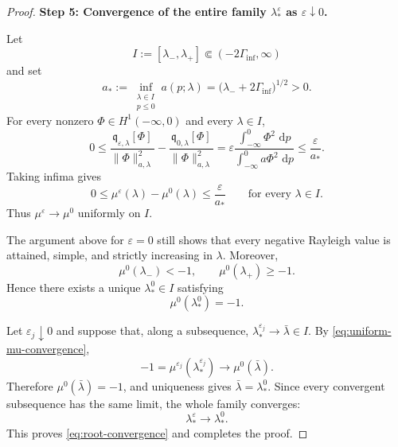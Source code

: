 \documentclass[10pt,a4paper]{amsart}
\newcommand{\dd}{\,\mathrm{d}}
\begin{document}
\begin{proof}
\medskip
\noindent
\textbf{Step 5: Convergence of the entire family
$\lambda_*^\varepsilon$ as $\varepsilon\downarrow0$.}

Let
\[
I:=[\lambda_-,\lambda_+]
\Subset(-2\Gamma_{\inf},\infty)
\]
and set
\[
a_*:=\inf_{\substack{\lambda\in I\\p\leq0}}
a(p;\lambda)
=
\bigl(\lambda_-+2\Gamma_{\inf}\bigr)^{1/2}>0.
\]
For every nonzero $\Phi\in H^1(-\infty,0)$ and every $\lambda\in I$,
\[
0
\leq
\frac{\mathfrak q_{\varepsilon,\lambda}[\Phi]}
{\|\Phi\|_{a,\lambda}^2}
-
\frac{\mathfrak q_{0,\lambda}[\Phi]}
{\|\Phi\|_{a,\lambda}^2}
=
\varepsilon
\frac{\displaystyle\int_{-\infty}^{0}\Phi^2\,\dd p}
{\displaystyle\int_{-\infty}^{0}a\Phi^2\,\dd p}
\leq
\frac{\varepsilon}{a_*}.
\]
Taking infima gives
\begin{equation}
\label{eq:uniform-mu-convergence}
0
\leq
\mu^\varepsilon(\lambda)-\mu^0(\lambda)
\leq
\frac{\varepsilon}{a_*}
\qquad
\text{for every }\lambda\in I.
\end{equation}
Thus $\mu^\varepsilon\to\mu^0$ uniformly on $I$.

The argument above for $\varepsilon=0$ still shows that every negative
Rayleigh value is attained, simple, and strictly increasing in
$\lambda$.  Moreover,
\[
\mu^0(\lambda_-)<-1,
\qquad
\mu^0(\lambda_+)\geq-1.
\]
Hence there exists a unique
$\lambda_*^0\in I$ satisfying
\[
\mu^0(\lambda_*^0)=-1.
\]

Let $\varepsilon_j\downarrow0$ and suppose that, along a subsequence,
$\lambda_*^{\varepsilon_j}\to\bar\lambda\in I$.  By
\eqref{eq:uniform-mu-convergence},
\[
-1
=
\mu^{\varepsilon_j}(\lambda_*^{\varepsilon_j})
\longrightarrow
\mu^0(\bar\lambda).
\]
Therefore $\mu^0(\bar\lambda)=-1$, and uniqueness gives
$\bar\lambda=\lambda_*^0$.  Since every convergent subsequence has
the same limit, the whole family converges:
\[
\lambda_*^\varepsilon\longrightarrow\lambda_*^0.
\]
This proves \eqref{eq:root-convergence} and completes the proof.
\end{proof}
\end{document}
